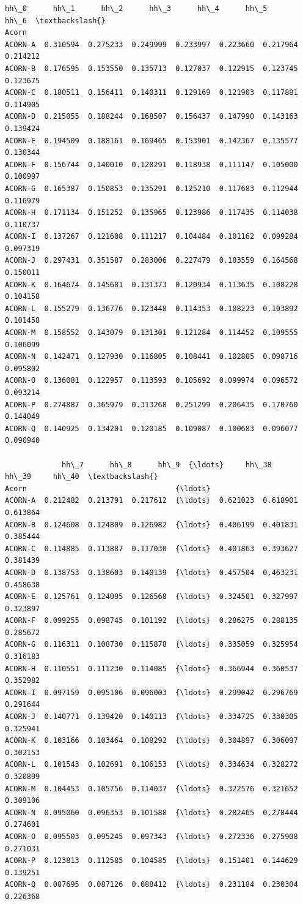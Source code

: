 \documentclass[11pt]{article}
\makeatletter
\newcommand{\boxspacing}{\kern\kvtcb@left@rule\kern\kvtcb@boxsep}
\newcommand{\prompt}[4]{
        {\ttfamily\llap{{\color{#2}[#3]:\hspace{3pt}#4}}\vspace{-\baselineskip}}
    }
\makeatother
\begin{document}
            \begin{tcolorbox}[breakable, size=fbox, boxrule=.5pt, pad at break*=1mm, opacityfill=0]
\prompt{Out}{outcolor}{87}{\boxspacing}
\begin{Verbatim}[commandchars=\\\{\}]
             hh\_0      hh\_1      hh\_2      hh\_3      hh\_4      hh\_5      hh\_6  \textbackslash{}
Acorn
ACORN-A  0.310594  0.275233  0.249999  0.233997  0.223660  0.217964  0.214212
ACORN-B  0.176595  0.153550  0.135713  0.127037  0.122915  0.123745  0.123675
ACORN-C  0.180511  0.156411  0.140311  0.129169  0.121903  0.117881  0.114905
ACORN-D  0.215055  0.188244  0.168507  0.156437  0.147990  0.143163  0.139424
ACORN-E  0.194509  0.188161  0.169465  0.153901  0.142367  0.135577  0.130344
ACORN-F  0.156744  0.140010  0.128291  0.118938  0.111147  0.105000  0.100997
ACORN-G  0.165387  0.150853  0.135291  0.125210  0.117683  0.112944  0.116979
ACORN-H  0.171134  0.151252  0.135965  0.123986  0.117435  0.114038  0.110737
ACORN-I  0.137267  0.121608  0.111217  0.104484  0.101162  0.099284  0.097319
ACORN-J  0.297431  0.351587  0.283006  0.227479  0.183559  0.164568  0.150011
ACORN-K  0.164674  0.145681  0.131373  0.120934  0.113635  0.108228  0.104158
ACORN-L  0.155279  0.136776  0.123448  0.114353  0.108223  0.103892  0.101458
ACORN-M  0.158552  0.143079  0.131301  0.121284  0.114452  0.109555  0.106099
ACORN-N  0.142471  0.127930  0.116805  0.108441  0.102805  0.098716  0.095802
ACORN-O  0.136081  0.122957  0.113593  0.105692  0.099974  0.096572  0.093214
ACORN-P  0.274887  0.365979  0.313268  0.251299  0.206435  0.170760  0.144049
ACORN-Q  0.140925  0.134201  0.120185  0.109087  0.100683  0.096077  0.090940

             hh\_7      hh\_8      hh\_9  {\ldots}     hh\_38     hh\_39     hh\_40  \textbackslash{}
Acorn                                  {\ldots}
ACORN-A  0.212482  0.213791  0.217612  {\ldots}  0.621023  0.618901  0.613864
ACORN-B  0.124608  0.124809  0.126982  {\ldots}  0.406199  0.401831  0.385444
ACORN-C  0.114885  0.113887  0.117030  {\ldots}  0.401863  0.393627  0.381439
ACORN-D  0.138753  0.138603  0.140139  {\ldots}  0.457504  0.463231  0.458638
ACORN-E  0.125761  0.124095  0.126568  {\ldots}  0.324501  0.327997  0.323897
ACORN-F  0.099255  0.098745  0.101192  {\ldots}  0.286275  0.288135  0.285672
ACORN-G  0.116311  0.108730  0.115878  {\ldots}  0.335059  0.325954  0.316183
ACORN-H  0.110551  0.111230  0.114085  {\ldots}  0.366944  0.360537  0.352982
ACORN-I  0.097159  0.095106  0.096003  {\ldots}  0.299042  0.296769  0.291644
ACORN-J  0.140771  0.139420  0.140113  {\ldots}  0.334725  0.330305  0.325941
ACORN-K  0.103166  0.103464  0.108292  {\ldots}  0.304897  0.306097  0.302153
ACORN-L  0.101543  0.102691  0.106153  {\ldots}  0.334634  0.328272  0.320899
ACORN-M  0.104453  0.105756  0.114037  {\ldots}  0.322576  0.321652  0.309106
ACORN-N  0.095060  0.096353  0.101588  {\ldots}  0.282465  0.278444  0.274601
ACORN-O  0.095503  0.095245  0.097343  {\ldots}  0.272336  0.275908  0.271031
ACORN-P  0.123813  0.112585  0.104585  {\ldots}  0.151401  0.144629  0.139251
ACORN-Q  0.087695  0.087126  0.088412  {\ldots}  0.231184  0.230304  0.226368


\end{Verbatim}
\end{tcolorbox}
\end{document}
